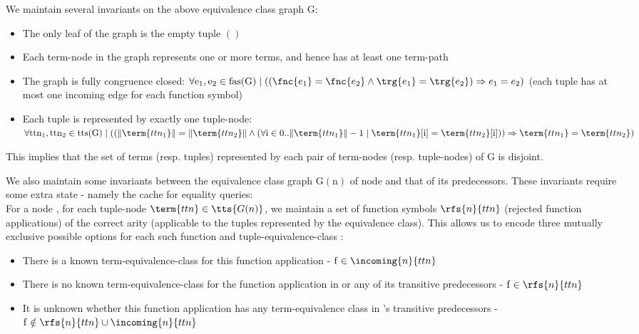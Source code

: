 We maintain several invariants on the above equivalence class graph $\mathrm{G}$:
\begin{itemize}
	\item The only leaf of the graph is the empty tuple $\mathbf{()}$
	\item Each term-node in the graph represents one or more terms, and hence has at least one term-path
	\item The graph is fully congruence closed: $\forall \mathrm{e_1,e_2} \in \mathrm{fas(G)} \mid ((\fnc{e_1}=\fnc{e_2} \land \trg{e_1}=\trg{e_2} ) \Rightarrow e_1=e_2)$ (each tuple has at most one incoming edge for each function symbol)
	\item Each tuple is represented by exactly one tuple-node: $\forall \mathrm{ttn_1,ttn_2} \in \mathrm{tts(G)} \mid ((\|\term{ttn_1}\|=\|\term{ttn_2}\| \land (\forall \mathrm{i} \in 0..\|\term{ttn_1}\|-1 \mid \term{ttn_1}[\mathrm{i}]=\term{ttn_2}[\mathrm{i}])) \Rightarrow \term{ttn_1}=\term{ttn_2})$
\end{itemize}

This implies that the set of terms (resp. tuples) represented by each pair of term-nodes (resp. tuple-nodes) of $\mathrm{G}$ is disjoint.

We also maintain some invariants between the equivalence class graph $\mathrm{G(n)}$ of node  and that of its predecessors. These invariants require some extra state - namely the cache for equality queries:\\
For a node , for each tuple-node $\term{ttn} \in \tts{G(n)}$, we maintain a set of function symbols $\rfs{n}{ttn}$ (rejected function applications) of the correct arity (applicable to the tuples represented by the equivalence class).
This allows us to encode three mutually exclusive possible options for each such function  and tuple-equivalence-class :
\begin{itemize}
	\item There is a known term-equivalence-class for this function application -
	$\mathrm{f} \in \incoming{n}{ttn}$
	\item There is no known term-equivalence-class for the function application in  or any of its transitive predecessors - $\mathrm{f} \in \rfs{n}{ttn}$
	\item It is unknown whether this function application has any term-equivalence class in 's transitive predecessors - $\mathrm{f} \notin \rfs{n}{ttn} \cup \incoming{n}{ttn}$
\end{itemize}

